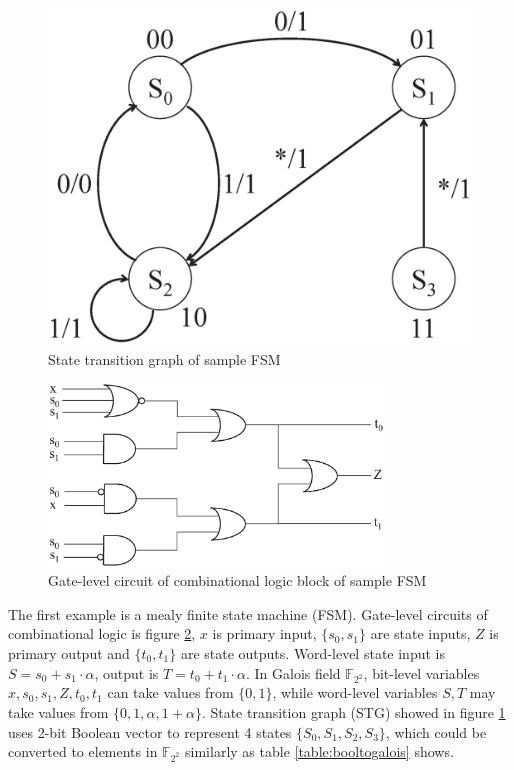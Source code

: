 \begin{figure}[hbt]
\begin{center}
\includegraphics[scale=0.3]{./stg_fig.ps}
\end{center}
\caption{State transition graph of sample FSM}
\label{fig:stg}
\end{figure}

\begin{figure}[hbt]
\begin{center}
\includegraphics[width=3.5in]{./fsm_fig.eps}
\end{center}
\caption{Gate-level circuit of combinational logic block of sample FSM}
\label{fig:fsm}
\end{figure}

The first example is a mealy finite state machine (FSM). Gate-level circuits of combinational logic
is figure \ref{fig:fsm}, $x$ is primary input,
$\{s_0, s_1\}$ are state inputs, $Z$ is primary output and $\{t_0, t_1\}$ are state outputs.
Word-level state input is $S = s_0 + s_1\cdot\alpha$, output is $T = t_0 + t_1\cdot\alpha$. In Galois field
$\mathbb{F}_{2^2}$, bit-level variables $x, s_0, s_1, Z, t_0, t_1$ can take values from $\{0, 1\}$, while
word-level variables $S, T$ may take values from $\{0, 1, \alpha, 1 + \alpha\}$. State transition graph (STG)
showed in figure \ref{fig:stg} uses 2-bit Boolean vector to represent 4 states $\{S_0, S_1, S_2, S_3\}$, which
could be converted to elements in $\mathbb{F}_{2^2}$ similarly as table \ref{table:booltogalois} shows.

